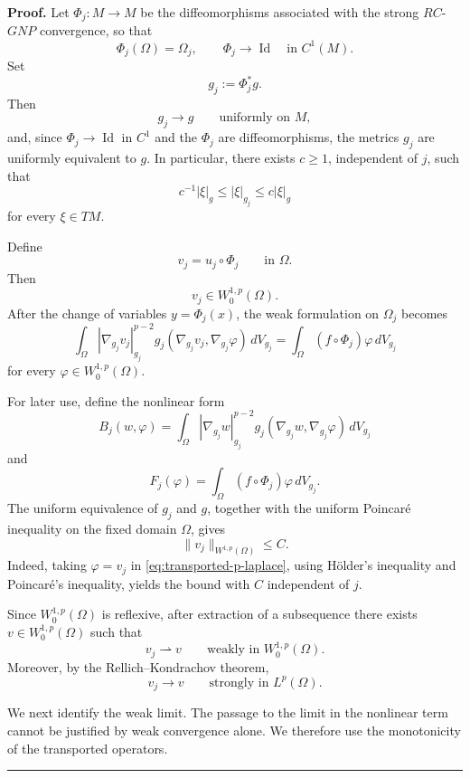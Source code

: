 \documentclass{article}
\newenvironment{proof}[1][Proof]{\textbf{#1.} }{\hfill\rule{0.5em}{0.5em}}
\begin{document}
\begin{proof}
Let $\Phi_j:M\to M$ be the diffeomorphisms associated with the strong
$RC$-$GNP$ convergence, so that
\[
\Phi_j(\Omega)=\Omega_j,
\qquad
\Phi_j\to\operatorname{Id}
\quad\text{in }C^1(M).
\]
Set
\[
g_j:=\Phi_j^*g.
\]
Then
\[
g_j\to g\qquad\text{uniformly on }M,
\]
and, since $\Phi_j\to\operatorname{Id}$ in $C^1$ and the $\Phi_j$ are
diffeomorphisms, the metrics $g_j$ are uniformly equivalent to $g$.
In particular, there exists $c\geq1$, independent of $j$, such that
\[
c^{-1}|\xi|_g\leq |\xi|_{g_j}\leq c|\xi|_g
\]
for every $\xi\in TM$.

Define
\[
v_j=u_j\circ\Phi_j\qquad\text{in }\Omega.
\]
Then
\[
v_j\in W_0^{1,p}(\Omega).
\]
After the change of variables $y=\Phi_j(x)$, the weak formulation on
$\Omega_j$ becomes
\begin{equation}
\int_\Omega
|\nabla_{g_j}v_j|_{g_j}^{p-2}
g_j(\nabla_{g_j}v_j,\nabla_{g_j}\varphi)
\,dV_{g_j}
=
\int_\Omega (f\circ\Phi_j)\varphi\,dV_{g_j}
\label{eq:transported-p-laplace}
\end{equation}
for every $\varphi\in W_0^{1,p}(\Omega)$.

For later use, define the nonlinear form
\[
B_j(w,\varphi)
=
\int_\Omega
|\nabla_{g_j}w|_{g_j}^{p-2}
g_j(\nabla_{g_j}w,\nabla_{g_j}\varphi)
\,dV_{g_j}
\]
and
\[
F_j(\varphi)
=
\int_\Omega(f\circ\Phi_j)\varphi\,dV_{g_j}.
\]
The uniform equivalence of $g_j$ and $g$, together with the uniform
Poincar\'e inequality on the fixed domain $\Omega$, gives
\[
\|v_j\|_{W^{1,p}(\Omega)}\leq C.
\]
Indeed, taking $\varphi=v_j$ in \eqref{eq:transported-p-laplace},
using H\"older's inequality and Poincar\'e's inequality, yields the
bound with $C$ independent of $j$.

Since $W_0^{1,p}(\Omega)$ is reflexive, after extraction of a
subsequence there exists $v\in W_0^{1,p}(\Omega)$ such that
\[
v_j\rightharpoonup v
\qquad\text{weakly in }W_0^{1,p}(\Omega).
\]
Moreover, by the Rellich--Kondrachov theorem,
\[
v_j\longrightarrow v
\qquad\text{strongly in }L^p(\Omega).
\]

We next identify the weak limit. The passage to the limit in the nonlinear term cannot be justified by weak convergence alone. We therefore use the monotonicity of the transported operators.


\end{proof}
\end{document}
